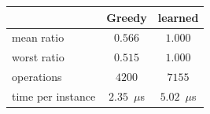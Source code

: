 \begin{tabular}{@{}lcc@{}}
\toprule
 & Greedy & learned \\
\midrule
mean ratio & $0.566$ & $1.000$ \\
worst ratio & $0.515$ & $1.000$ \\
operations & $4200$ & $7155$ \\
time per instance & $2.35$~$\mu$s & $5.02$~$\mu$s \\
\bottomrule
\end{tabular}
